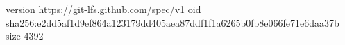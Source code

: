version https://git-lfs.github.com/spec/v1
oid sha256:e2dd5af1d9ef864a123179dd405aea87ddf1f1a6265b0fb8e066fe71e6daa37b
size 4392
